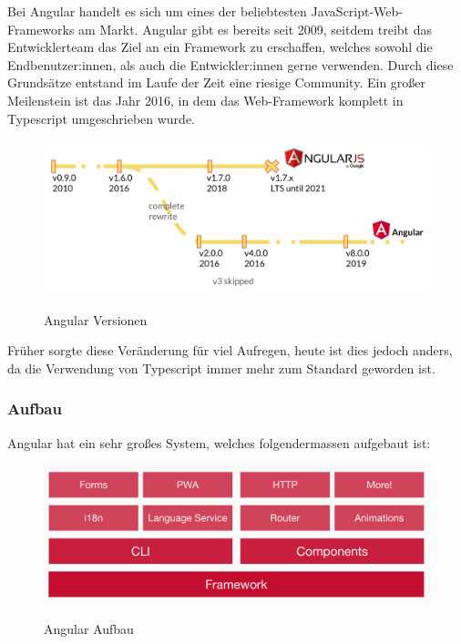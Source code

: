 Bei Angular handelt es sich um eines der beliebtesten JavaScript-Web-Frameworks am Markt. Angular gibt es bereits seit 2009, seitdem treibt das Entwicklerteam das Ziel an ein Framework zu erschaffen, welches sowohl die Endbenutzer:innen, als auch die Entwickler:innen gerne verwenden. Durch diese Grundsätze entstand im Laufe der Zeit eine riesige Community. Ein großer Meilenstein ist das Jahr 2016, in dem das Web-Framework komplett in Typescript umgeschrieben wurde.

\begin{figure}[h!]
    \centering
    \includegraphics[width=1\textwidth]{pics/angular-versions.png}
    \caption{Angular Versionen}
    \cite{frontend_web_angular_introduction}
    \label{fig:mesh1}
\end{figure}

Früher sorgte diese Veränderung für viel Aufregen, heute ist dies jedoch anders, da die Verwendung von Typescript immer mehr zum Standard geworden ist.

\newpage
\subsubsection{Aufbau}
Angular hat ein sehr großes System, welches folgendermassen aufgebaut ist:

\begin{figure}[h!]
    \centering
    \includegraphics[width=1\textwidth]{pics/angular-architecture.png}
    \caption{Angular Aufbau}
    \cite{frontend_web_angular_introduction}
    \label{fig:mesh1}
\end{figure}

